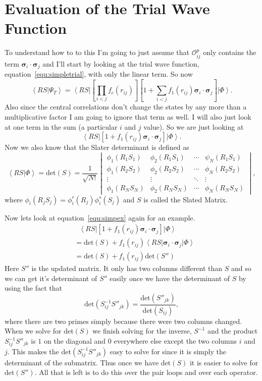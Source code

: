 \documentclass[12pt]{extarticle}
\newcommand{\Oijp}{\mathcal{O}^p_{ij}}
\newcommand{\ket}[1]{\left| #1 \right>}
\newcommand{\bra}[1]{\left< #1 \right|}
\newcommand{\braket}[2]{\left< #1 | #2 \right>}
\newcommand{\sigmai}{\bm{\sigma}_i}
\newcommand{\sigmaj}{\bm{\sigma}_j}
\newcommand{\sigmaij}{\sigmai \cdot \sigmaj}
\begin{document}
\section{Evaluation of the Trial Wave Function}
To understand how to to this I'm going to just assume that $\Oijp$ only contains the term $\sigmaij$ and I'll start by looking at the trial wave function, equation~\ref{equ:simpletrial}, with only the linear term. So now
\begin{equation}
  \braket{RS}{\Psi_T} = \bra{RS} \left[ \prod_{i<j}f_c(r_{ij}) \right] \left[ 1+\sum_{i<j} f_1(r_{ij})\sigmaij \right] \ket{\Phi}.
\end{equation}
Also since the central correlations don't change the states by any more than a multiplicative factor I am going to ignore that term as well. I will also just look at one term in the sum (a particular $i$ and $j$ value). So we are just looking at
\begin{equation}
  \bra{RS} \left[ 1+f_1(r_{ij})\sigmaij \right] \ket{\Phi}.
  \label{equ:simpex}
\end{equation}
Now we also know that the Slater determinant is defined as
\begin{equation}
  \braket{RS}{\Phi} = \mathrm{det}(S) = \frac{1}{\sqrt{N!}} \begin{vmatrix}
  \phi_1(R_1S_1) & \phi_2(R_1S_1) & \cdots & \psi_N(R_1S_1) \\ 
  \phi_1(R_2S_2) & \phi_2(R_2S_2) & \cdots & \phi_N(R_2S_2) \\
  \vdots & \vdots & \ddots &\vdots \\
  \phi_1(R_NS_N)& \phi_2(R_NS_N) & \cdots & \phi_N(R_NS_N) \end{vmatrix},
\end{equation}
where $\phi_i(R_jS_j)=\phi^r_i(R_j)\phi^s_i(S_j)$ and $S$ is called the Slated Matrix.

Now lets look at equation~\ref{equ:simpex} again for an example.
\begin{align}
  & ~ ~ ~ \bra{RS} \left[ 1+f_1(r_{ij})\sigmaij \right] \ket{\Phi} \\
  &= \mathrm{det}(S) + f_1(r_{ij}) \bra{RS}\sigmaij\ket{\Phi} \\
  &= \mathrm{det}(S) + f_1(r_{ij})\mathrm{det}(S'')
\end{align}
Here $S''$ is the updated matrix. It only has two columns different than $S$ and so we can get it's determinant of $S''$ easily once we have the determinant of $S$ by using the fact that
\begin{equation}
  \mathrm{det}(S^{-1}_{ij} S''_{jk}) = \frac{\mathrm{det}(S''_{jk})}{\mathrm{det}(S_{ij})},
\end{equation}
where there are two primes simply because there were two columns changed. When we solve for $\mathrm{det}(S)$ we finish solving for the inverse, $S^{-1}$ and the product $S^{-1}_{ij}S''_{jk}$ is $1$ on the diagonal and $0$ everywhere else except the two columns $i$ and $j$. This makes the $\mathrm{det}(S^{-1}_{ij}S''_{jk})$ easy to solve for since it is simply the determinant of the submatrix. Thus once we have $\mathrm{det}(S)$ it is easier to solve for $\mathrm{det}(S'')$. All that is left is to do this over the pair loops and over each operator.
\end{document}
